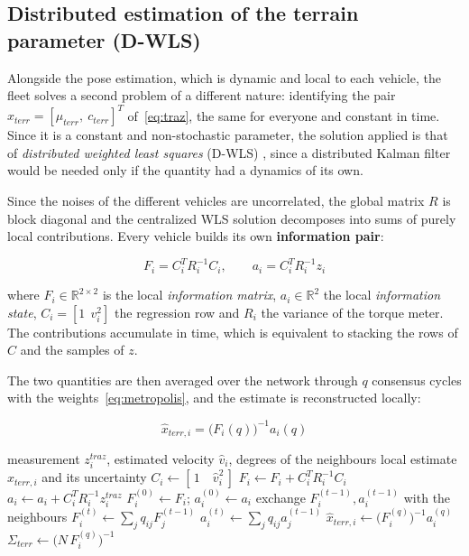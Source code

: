 \documentclass[conference,9pt]{IEEEtran}
\begin{document}
\subsection{Distributed estimation of the terrain parameter (D-WLS)}
\label{sub:dwls}

Alongside the pose estimation, which is dynamic and local to each vehicle, the
fleet solves a second problem of a different nature: identifying the pair
$x_{terr} = [\mu_{terr},\ c_{terr}]^T$ of~\eqref{eq:traz}, the same for
everyone and constant in time. Since it is a constant and non-stochastic
parameter, the solution applied is that of \emph{distributed weighted least
squares} (D-WLS) \cite{fontanelli_notes}, since a distributed Kalman filter
would be needed only if the quantity had a dynamics of its own.

Since the noises of the different vehicles are uncorrelated, the global matrix
$R$ is block diagonal and the centralized WLS solution decomposes into sums of
purely local contributions. Every vehicle builds its own
\textbf{information pair}:

\begin{equation}
F_i = C_i^T R_i^{-1} C_i, \qquad a_i = C_i^T R_i^{-1} z_i
\label{eq:coppia}
\end{equation}

where $F_i \in \mathbb{R}^{2\times2}$ is the local \emph{information matrix},
$a_i \in \mathbb{R}^2$ the local \emph{information state},
$C_i = [1\ \ v_i^2]$ the regression row and $R_i$ the variance of the torque
meter. The contributions accumulate in time, which is equivalent to stacking
the rows of $C$ and the samples of $z$.

The two quantities are then averaged over the network through $q$ consensus
cycles with the weights~\eqref{eq:metropolis}, and the estimate is
reconstructed locally:

\begin{equation}
\hat x_{terr,i} = \big(F_i(q)\big)^{-1} a_i(q)
\label{eq:ricostruzione}
\end{equation}

\begin{algorithm}[t]
\caption{D-WLS run by vehicle $i$ at every step}
\label{alg:dwls}
\begin{algorithmic}[1]
\Require measurement $z^{traz}_i$, estimated velocity $\hat v_i$, degrees of the neighbours
\Ensure local estimate $\hat x_{terr,i}$ and its uncertainty
\State $C_i \gets [\,1 \quad \hat v_i^2\,]$
\State $F_i \gets F_i + C_i^T R_i^{-1} C_i$
\State $a_i \gets a_i + C_i^T R_i^{-1} z^{traz}_i$
\State $F_i^{(0)} \gets F_i$; \quad $a_i^{(0)} \gets a_i$
  \State exchange $F_i^{(t-1)}, a_i^{(t-1)}$ with the neighbours
  \State $F_i^{(t)} \gets \sum_j q_{ij} F_j^{(t-1)}$
  \State $a_i^{(t)} \gets \sum_j q_{ij} a_j^{(t-1)}$
\EndFor
\State $\hat x_{terr,i} \gets \big(F_i^{(q)}\big)^{-1} a_i^{(q)}$
\State $\Sigma_{terr} \gets \big(N\,F_i^{(q)}\big)^{-1}$
\end{algorithmic}
\end{algorithm}
\end{document}
